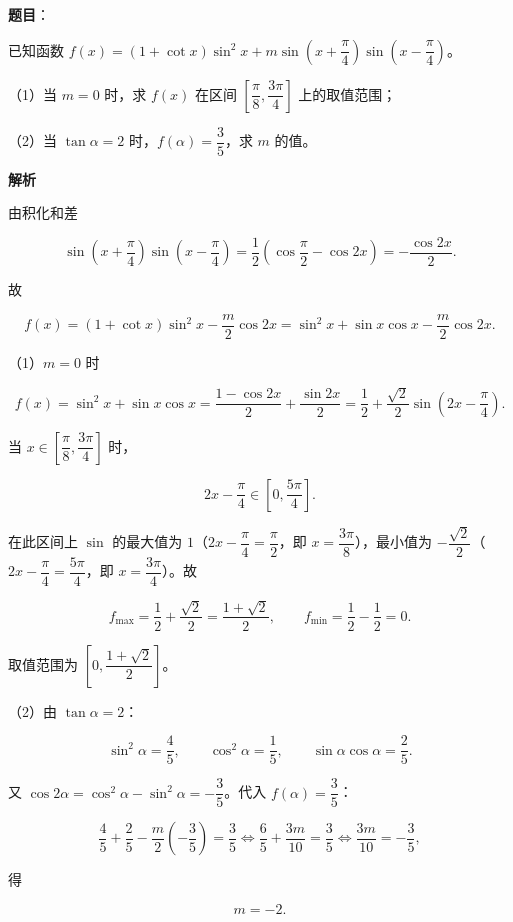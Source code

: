 \begin{answer}

\textbf{题目}：

已知函数 $f(x)=(1+\cot x)\sin^2x+m\sin\left(x+\dfrac\pi4\right)\sin\left(x-\dfrac\pi4\right)$。

（1）当 $m=0$ 时，求 $f(x)$ 在区间 $\left[\dfrac\pi8,\dfrac{3\pi}4\right]$ 上的取值范围；

（2）当 $\tan\alpha=2$ 时，$f(\alpha)=\dfrac35$，求 $m$ 的值。

\textbf{解析}

由积化和差

\nopagebreak[4]
\[\sin\left(x+\frac\pi4\right)\sin\left(x-\frac\pi4\right)
=\frac12\left(\cos\frac\pi2-\cos2x\right)=-\frac{\cos2x}2.\]

故

\nopagebreak[4]
\[f(x)=(1+\cot x)\sin^2x-\frac m2\cos2x
=\sin^2x+\sin x\cos x-\frac m2\cos2x.\]

（1）$m=0$ 时

\nopagebreak[4]
\[f(x)=\sin^2x+\sin x\cos x
=\frac{1-\cos2x}2+\frac{\sin2x}2
=\frac12+\frac{\sqrt2}2\sin\left(2x-\frac\pi4\right).\]

当 $x\in\left[\dfrac\pi8,\dfrac{3\pi}4\right]$ 时，

\nopagebreak[4]
\[2x-\frac\pi4\in\left[0,\frac{5\pi}4\right].\]

在此区间上 $\sin$ 的最大值为 $1$（$2x-\dfrac\pi4=\dfrac\pi2$，即 $x=\dfrac{3\pi}8$），最小值为 $-\dfrac{\sqrt2}2$（$2x-\dfrac\pi4=\dfrac{5\pi}4$，即 $x=\dfrac{3\pi}4$）。故

\nopagebreak[4]
\[f_{\max}=\frac12+\frac{\sqrt2}2=\frac{1+\sqrt2}{2},\qquad
f_{\min}=\frac12-\frac12=0.\]

取值范围为 $\left[0,\dfrac{1+\sqrt2}{2}\right]$。

（2）由 $\tan\alpha=2$：

\nopagebreak[4]
\[\sin^2\alpha=\frac45,\qquad \cos^2\alpha=\frac15,\qquad \sin\alpha\cos\alpha=\frac25.\]

又 $\cos2\alpha=\cos^2\alpha-\sin^2\alpha=-\dfrac35$。代入 $f(\alpha)=\dfrac35$：

\nopagebreak[4]
\[\frac45+\frac25-\frac m2\left(-\frac35\right)=\frac35
\iff \frac65+\frac{3m}{10}=\frac35
\iff \frac{3m}{10}=-\frac35,\]

得

\nopagebreak[4]
\[m=-2.\]


\end{answer}
